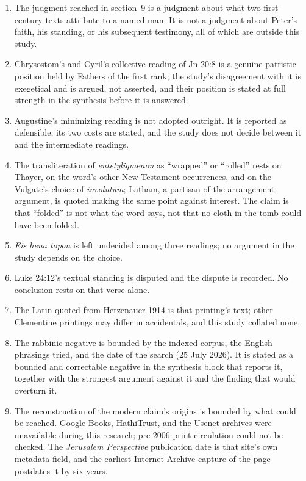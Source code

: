 \begin{enumerate}
\item The judgment reached in section~9 is a judgment about what two
first-century texts attribute to a named man. It is not a judgment about
Peter's faith, his standing, or his subsequent testimony, all of which are
outside this study.
\item Chrysostom's and Cyril's collective reading of Jn 20:8 is a genuine
patristic position held by Fathers of the first rank; the study's disagreement
with it is exegetical and is argued, not asserted, and their position is stated
at full strength in the synthesis before it is answered.
\item Augustine's minimizing reading is not adopted outright. It is reported as
defensible, its two costs are stated, and the study does not decide between it
and the intermediate readings.
\item The transliteration of \emph{entetyligmenon} as ``wrapped'' or ``rolled''
rests on Thayer, on the word's other New Testament occurrences, and on the
Vulgate's choice of \emph{involutum}; Latham, a partisan of the arrangement
argument, is quoted making the same point against interest. The claim is that
``folded'' is not what the word says, not that no cloth in the tomb could have
been folded.
\item \emph{Eis hena topon} is left undecided among three readings; no argument
in the study depends on the choice.
\item Luke 24:12's textual standing is disputed and the dispute is recorded. No
conclusion rests on that verse alone.
\item The Latin quoted from Hetzenauer 1914 is that printing's text; other
Clementine printings may differ in accidentals, and this study collated none.
\item The rabbinic negative is bounded by the indexed corpus, the English
phrasings tried, and the date of the search (25 July 2026). It is stated as a
bounded and correctable negative in the synthesis block that reports it,
together with the strongest argument against it and the finding that would
overturn it.
\item The reconstruction of the modern claim's origins is bounded by what could
be reached. Google Books, HathiTrust, and the Usenet archives were unavailable
during this research; pre-2006 print circulation could not be checked. The
\emph{Jerusalem Perspective} publication date is that site's own metadata field,
and the earliest Internet Archive capture of the page postdates it by six years.

\end{enumerate}
